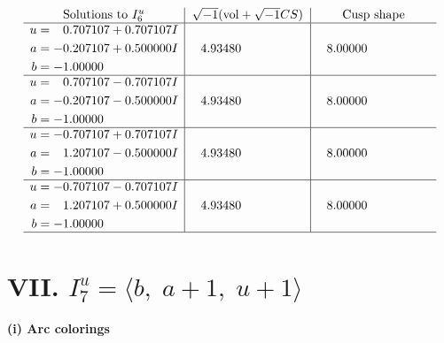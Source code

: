 \documentclass[1p]{elsarticle_modified}
\theoremstyle{definition}
\newcommand{\I}{\sqrt{-1}}
\begin{document}
$$\begin{array}{c|c|c}  
\text{Solutions to }I^u_{6}& \I (\text{vol} + \sqrt{-1}CS) & \text{Cusp shape}\\
 \hline 
\begin{aligned}
u &= \phantom{-}0.707107 + 0.707107 I \\
a &= -0.207107 + 0.500000 I \\
b &= -1.00000\phantom{ +0.000000I}\end{aligned}
 & \phantom{-}4.93480\phantom{ +0.000000I} & \phantom{-}8.00000\phantom{ +0.000000I} \\ \hline\begin{aligned}
u &= \phantom{-}0.707107 - 0.707107 I \\
a &= -0.207107 - 0.500000 I \\
b &= -1.00000\phantom{ +0.000000I}\end{aligned}
 & \phantom{-}4.93480\phantom{ +0.000000I} & \phantom{-}8.00000\phantom{ +0.000000I} \\ \hline\begin{aligned}
u &= -0.707107 + 0.707107 I \\
a &= \phantom{-}1.207107 - 0.500000 I \\
b &= -1.00000\phantom{ +0.000000I}\end{aligned}
 & \phantom{-}4.93480\phantom{ +0.000000I} & \phantom{-}8.00000\phantom{ +0.000000I} \\ \hline\begin{aligned}
u &= -0.707107 - 0.707107 I \\
a &= \phantom{-}1.207107 + 0.500000 I \\
b &= -1.00000\phantom{ +0.000000I}\end{aligned}
 & \phantom{-}4.93480\phantom{ +0.000000I} & \phantom{-}8.00000\phantom{ +0.000000I}\\
 \hline 
 \end{array}$$\newpage\newpage\renewcommand{\arraystretch}{1}
\centering \section*{VII. $I^u_{7}= \langle b,\;a+1,\;u+1 \rangle$}
\flushleft \textbf{(i) Arc colorings}\\
\end{document}

